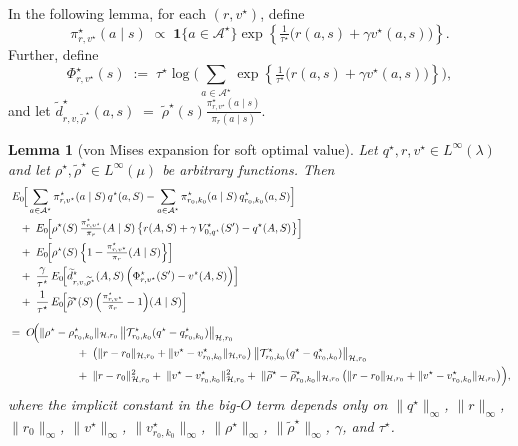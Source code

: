 \documentclass[11pt]{article}
\theoremstyle{plain}
\newtheorem{lemma}[theorem]{Lemma}
\begin{document}
 



In the following lemma, for each $(r, v^\star)$, define
\[
\pi_{r,v^\star}^\star(a \mid s)
\;\propto\;
\mathbf{1}\{a \in \mathcal{A}^\star\}
\exp\!\left\{
    \tfrac{1}{\tau^\star}\bigl(r(a,s) + \gamma v^\star(a,s)\bigr)
\right\}.
\]
Further, define
\[
\Phi_{r,v^\star}^\star(s)
\;:=\;
\tau^\star \log\!\Biggl(
\sum_{a \in \mathcal{A}^\star}
\exp\!\left\{
    \tfrac{1}{\tau^\star}\bigl(r(a,s) + \gamma v^\star(a,s)\bigr)
\right\}
\Biggr),
\]
and let $\widetilde{d}_{r,v,\widetilde{\rho}^\star}^\star(a,s)
\;=\;
\widetilde{\rho}^\star(s)
\frac{\pi_{r,v^\star}^\star(a \mid s)}{\pi_r(a \mid s)}.$


\begin{lemma}[von Mises expansion for soft optimal value]
\label{lemma::vonmises_softstar}
Let $q^\star, r, v^\star \in L^\infty(\lambda)$ and let $\rho^\star, \widetilde{\rho}^\star \in L^\infty(\mu)$ be arbitrary functions. Then
    \begin{align*}
&\;E_0\!\Big[
    \sum_{a \in \mathcal{A}^\star} 
        \pi_{r,v^\star}^\star(a \mid S)\,q^\star(a,S) 
        - 
        \sum_{a \in \mathcal{A}^\star} 
        \pi_{r_0,k_0}^\star(a \mid S)\,q_{r_0,k_0}^\star(a,S)
\Big]
\\
&\quad+\;
E_0\!\Big[
    \rho^\star(S)\,
    \tfrac{\pi_{r,v^\star}^\star}{\pi_r}(A \mid S)\,
    \bigl\{ r(A,S)+\gamma\,V_{0,q^\star}^\star(S')-q^\star(A,S)\bigr\}
\Big]
\\
&\quad+\;
E_0\!\Big[
    \rho^\star(S)\,
    \Bigl\{1-\tfrac{\pi_{r,v^\star}^\star}{\pi_r}(A \mid S)\Bigr\}
\Big]
\\
&\quad+\;
\frac{\gamma}{\tau^\star}\,
E_0\!\Big[
       \widetilde{d}_{r,v,\widetilde{\rho}^\star}^\star(A,S)\,
       \Bigl(\Phi_{r,v^\star}^\star(S') - v^\star(A,S)\Bigr)
\Big]
\\
&\quad+\;
\frac{1}{\tau^\star}\,
E_0\!\Big[
        \widetilde{\rho}^\star(S)\,
        \Bigl(\tfrac{\pi_{r,v^\star}^\star}{\pi_r}-1\Bigr)(A \mid S)
\Big]
\\[6pt]
&=\;
O\!\Big(
     \|\rho^\star - \rho_{r_0,k_0}^\star\|_{\mathcal{H},r_0}\,
     \bigl\|\mathcal{T}_{r_0,k_0}^\star(q^\star - q_{r_0,k_0}^\star)\bigr\|_{\mathcal{H},r_0}
\\
&\hspace{2.2cm}
     +\;
     \bigl(\|r-r_0\|_{\mathcal{H},r_0} + \|v^\star - v_{r_0,k_0}^\star\|_{\mathcal{H},r_0}\bigr)\,
     \bigl\|\mathcal{T}_{r_0,k_0}^\star(q^\star - q_{r_0,k_0}^\star)\bigr\|_{\mathcal{H},r_0}
\\
&\hspace{2.2cm}
     +\;
     \|r-r_0\|_{\mathcal{H},r_0}^{2}
     +\;
     \|v^\star - v_{r_0,k_0}^\star\|_{\mathcal{H},r_0}^{2}
     +\;
     \|\widetilde{\rho}^\star - \widetilde{\rho}_{r_0,k_0}^\star\|_{\mathcal{H},r_0}\,
     \bigl(\|r-r_0\|_{\mathcal{H},r_0}+\|v^\star - v_{r_0,k_0}^\star\|_{\mathcal{H},r_0}\bigr)
\Big),
\end{align*}
where the implicit constant in the big-$O$ term depends only on 
\(\|q^\star\|_\infty\), 
\(\|r\|_\infty\), 
\(\|r_0\|_\infty\), 
\(\|v^\star\|_\infty\), 
\(\|v_{r_0,k_0}^\star\|_\infty\), 
\(\|\rho^\star\|_\infty\), 
\(\|\widetilde{\rho}^\star\|_\infty\), 
\(\gamma\), and \(\tau^\star\).


\end{lemma}
\end{document}
